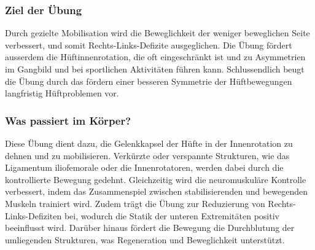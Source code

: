\subsubsection{Ziel der Übung}
Durch gezielte Mobilisation wird die Beweglichkeit der weniger beweglichen Seite verbessert, und somit Rechts-Links-Defizite ausgeglichen.
Die Übung fördert ausserdem die Hüftinnenrotation, die oft eingeschränkt ist und zu Asymmetrien im Gangbild und bei sportlichen Aktivitäten führen kann.
Schlussendlich beugt die Übung durch das fördern einer besseren Symmetrie der Hüftbewegungen langfristig Hüftproblemen vor.


\subsubsection{Was passiert im Körper?}
Diese Übung dient dazu, die Gelenkkapsel der Hüfte in der Innenrotation zu dehnen und zu mobilisieren.
Verkürzte oder verspannte Strukturen, wie das Ligamentum iliofemorale oder die Innenrotatoren, werden dabei durch die kontrollierte Bewegung gedehnt.
Gleichzeitig wird die neuromuskuläre Kontrolle verbessert, indem das Zusammenspiel zwischen stabilisierenden und bewegenden Muskeln trainiert wird.
Zudem trägt die Übung zur Reduzierung von Rechts-Links-Defiziten bei, wodurch die Statik der unteren Extremitäten positiv beeinflusst wird.
Darüber hinaus fördert die Bewegung die Durchblutung der umliegenden Strukturen, was Regeneration und Beweglichkeit unterstützt.

